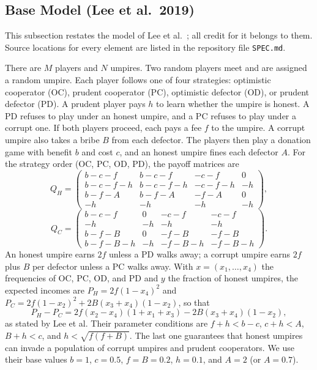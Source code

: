 \documentclass[journal]{IEEEtran}
\begin{document}
\subsection{Base Model (Lee et al.\ 2019)}\label{sec:base}

This subsection restates the model of Lee et al.~\cite{lee2019social}; all credit for it belongs
to them. Source locations for every element are listed in the repository file \texttt{SPEC.md}.

There are $M$ players and $N$ umpires. Two random players meet and are assigned a random umpire.
Each player follows one of four strategies: optimistic cooperator (OC), prudent cooperator (PC),
optimistic defector (OD), or prudent defector (PD). A prudent player pays $h$ to learn whether the
umpire is honest. A PD refuses to play under an honest umpire, and a PC refuses to play under a
corrupt one. If both players proceed, each pays a fee $f$ to the umpire. A corrupt umpire also
takes a bribe $B$ from each defector. The players then play a donation game with benefit $b$ and
cost $c$, and an honest umpire fines each defector $A$. For the strategy order (OC, PC, OD, PD),
the payoff matrices are
{\setlength{\arraycolsep}{2.5pt}\small
\begin{equation}
Q_H=\begin{pmatrix}
b-c-f & b-c-f & -c-f & 0\\
b-c-f-h & b-c-f-h & -c-f-h & -h\\
b-f-A & b-f-A & -f-A & 0\\
-h & -h & -h & -h
\end{pmatrix},
\end{equation}
\begin{equation}
Q_C=\begin{pmatrix}
b-c-f & 0 & -c-f & -c-f\\
-h & -h & -h & -h\\
b-f-B & 0 & -f-B & -f-B\\
b-f-B-h & -h & -f-B-h & -f-B-h
\end{pmatrix}.
\end{equation}}%
An honest umpire earns $2f$ unless a PD walks away; a corrupt umpire earns $2f$ plus $B$ per
defector unless a PC walks away. With $x=(x_1,\dots,x_4)$ the frequencies of OC, PC, OD, and PD
and $y$ the fraction of honest umpires, the expected incomes are $P_H=2f(1-x_4)^2$ and
$P_C=2f(1-x_2)^2+2B(x_3+x_4)(1-x_2)$, so that
\begin{equation}
P_H-P_C=2f(x_2-x_4)(1+x_1+x_3)-2B(x_3+x_4)(1-x_2),\label{eq:ump}
\end{equation}
as stated by Lee et al. Their parameter conditions are $f+h<b-c$, $c+h<A$, $B+h<c$, and
$h<\sqrt{f(f+B)}$. The last one guarantees that honest umpires can invade a population of corrupt
umpires and prudent cooperators. We use their base values $b=1$, $c=0.5$, $f=B=0.2$, $h=0.1$, and
$A=2$ (or $A=0.7$).
\end{document}
